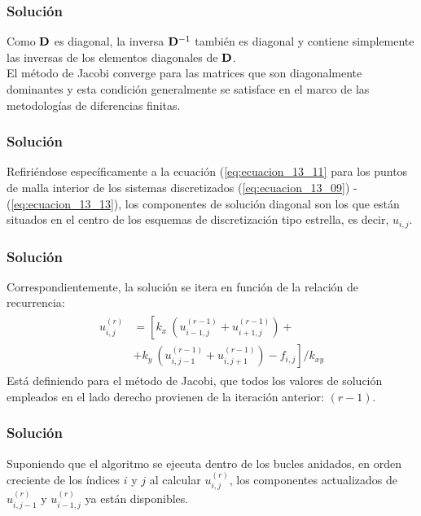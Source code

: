 \begin{frame}
\frametitle{Solución}
Como $\vb{D}$ es diagonal, la inversa $\vb{D}^{-1}$ también es diagonal y contiene simplemente las inversas de los elementos diagonales de $\vb{D}$.
\\
\bigskip
El método de Jacobi converge para las matrices que son diagonalmente dominantes y esta condición generalmente se satisface en el marco de las metodologías de diferencias finitas.
\end{frame}
\begin{frame}
\frametitle{Solución}
Refiriéndose específicamente a la ecuación (\ref{eq:ecuacion_13_11} para los puntos de malla interior de los sistemas discretizados (\ref{eq:ecuacion_13_09}) - (\ref{eq:ecuacion_13_13}), los componentes de solución diagonal son los que están situados en el centro de los esquemas de discretización tipo estrella, es decir, $u_{i,j}$.
\end{frame}
\begin{frame}
\frametitle{Solución}
Correspondientemente, la solución se itera en función de la relación de recurrencia:
\begin{align}
\begin{aligned}
u_{i,j}^{(r)} &= \left[ k_{x} \: \left( u_{i-1,j}^{(r-1)} + u_{i+1, j}^{(r-1)} \right) + \right. \\
&+ \left. k_{y} \: \left( u_{i,j-1}^{(r-1)} + u_{i, j+1}^{(r-1)} \right) - f_{i,j} \right] / k_{xy}
\end{aligned}
\label{eq:ecuacion_13_22} 	
\end{align}
\pause
Está definiendo para el método de Jacobi, que todos los valores de solución empleados en el lado derecho provienen de la iteración anterior: $(r - 1)$.
\end{frame}
\begin{frame}
\frametitle{Solución}
Suponiendo que el algoritmo se ejecuta dentro de los bucles anidados, en orden creciente de los índices $i$ y $j$ al calcular $u_{i,j}^{(r)}$, los componentes actualizados de $u_{i, j-1}^{(r)}$ y $u_{i-1, j}^{(r)}$ ya están disponibles.
\end{frame}
